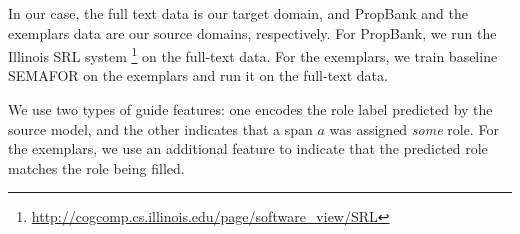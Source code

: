\documentclass[11pt,a4paper]{article}
\newcommand{\exemplars}{\mathrm{ex}}
\newcommand{\fulltext}{\mathrm{ft}}
\newcommand{\ensuretext}[1]{#1}
\newcommand{\nssmarker}{\ensuretext{\textcolor{magenta}{\ensuremath{^{\textsc{NS}}_{\textsc{S}}}}}}
\newcommand{\mkmarker}{\ensuretext{\textcolor{red}{\ensuremath{^{\textsc{M}}_{\textsc{K}}}}}}
\newcommand{\stmarker}{\ensuretext{\textcolor{orange}{\ensuremath{^{\textsc{S}}_{\textsc{T}}}}}}
\newcommand{\arkcomment}[3]{\ensuretext{\textcolor{#3}{[#1 #2]}}}
\newcommand{\nss}[1]{\arkcomment{\nssmarker}{#1}{magenta}}
\newcommand{\mk}[1]{\arkcomment{\mkmarker}{#1}{red}}
\newcommand{\st}[1]{\arkcomment{\stmarker}{#1}{orange}}
\newcommand{\x}{\mathbf{x}}
\begin{document}
In our case, the full text data is our target domain, and PropBank and the
exemplars data are our source domains, respectively.
For PropBank, we run the Illinois SRL system
 \citep{punyakanok-08} \footnote{\url{http://cogcomp.cs.illinois.edu/page/software_view/SRL}} 
 on the full-text data.
For the exemplars, we train baseline SEMAFOR on the exemplars and run it on the
full-text data.

We use two types of guide features:
one encodes the role label predicted by the source model,
and the other indicates that a span $a$ was assigned \emph{some} role. 
For the exemplars, %
we use an additional feature to indicate that 
the predicted role matches the role being filled. 


% 
% 
\end{document}
